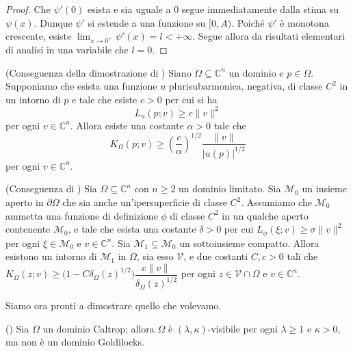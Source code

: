 \begin{proof}
    Che $\psi'(0)$ esista e sia uguale a $0$ segue immediatamente dalla stima su $\psi(x)$. Dunque $\psi'$ si estende a una funzione su $[0,A)$. Poiché $\psi'$ è monotona crescente, esiste $\displaystyle\lim_{x\longrightarrow0^+}\psi'(x)=l<+\infty$. Segue allora da risultati elementari di analisi in una variabile che $l=0$.
\end{proof}

\begin{lm} \label{pshestimate}
    (Conseguenza della dimostrazione di \cite[Proposition 6]{Si}) Siano $\Omega\subseteq\mathbb{C}^n$ un dominio e $p\in\Omega$. Supponiamo che esista una funzione $u$ plurisubarmonica, negativa, di classe $C^2$ in un intorno di $p$ e tale che esiste $c>0$ per cui si ha
    $$L_u(p;v) \ge c\|v\|^2$$
    per ogni $v\in\mathbb{C}^n$. Allora esiste una costante $\alpha>0$ tale che
    $$K_\Omega(p;v)\ge\left(\frac{c}{\alpha}\right)^{1/2}\frac{\|v\|}{|u(p)|^{1/2}}$$
    per ogni $v\in\mathbb{C}^n$.
\end{lm}

\begin{lm}\label{psdcvxcpt}
    (Conseguenza di \cite[Theorem B]{M}) Sia $\Omega\subseteq\mathbb{C}^n$ con $n\ge 2$ un dominio limitato. Sia $\mathcal{M}_0$ un insieme aperto in $\partial\Omega$ che sia anche un'ipersuperficie di classe $C^2$. Assumiamo che $\mathcal{M}_0$ ammetta una funzione di definizione $\phi$ di classe $C^2$ in un qualche aperto contenente $\mathcal{M}_0$, e tale che esista una costante $\delta>0$ per cui $L_\phi(\xi;v)\ge\sigma\|v\|^2$ per ogni $\xi\in\mathcal{M}_0$ e $v\in\mathbb{C}^n$. Sia $\mathcal{M}_1\subsetneq\mathcal{M}_0$ un sottoinsieme compatto. Allora esistono un intorno di $\mathcal{M}_1$ in $\overline{\Omega}$, sia esso $\mathcal{V}$, e due costanti $C,c>0$ tali che $K_\Omega(z;v)\ge \big(1-C\delta_\Omega(z)^{1/2}\big)\dfrac{c\|v\|}{\delta_\Omega(z)^{1/2}}$ per ogni $z\in\mathcal{V}\cap\Omega$ e $v\in\mathbb{C}^n$.
\end{lm}

Siamo ora pronti a dimostrare quello che volevamo.

\begin{thm}
    (\cite[Theorem 1.4]{BM}) Sia $\Omega$ un dominio Caltrop; allora $\Omega$ è $(\lambda,\kappa)$-visibile per ogni $\lambda \ge 1$ e $\kappa>0$, ma non è un dominio Goldilocks.
\end{thm}


